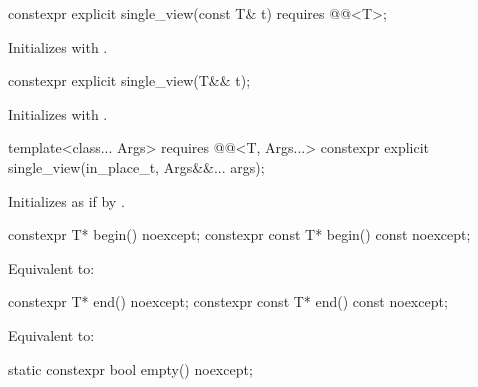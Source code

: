 %
\begin{itemdecl}
constexpr explicit single_view(const T& t) requires @@<T>;
\end{itemdecl}

\begin{itemdescr}
\pnum
\effects
Initializes  with .
\end{itemdescr}

%
\begin{itemdecl}
constexpr explicit single_view(T&& t);
\end{itemdecl}

\begin{itemdescr}
\pnum
\effects
Initializes  with .
\end{itemdescr}

%
\begin{itemdecl}
template<class... Args>
  requires @@<T, Args...>
constexpr explicit single_view(in_place_t, Args&&... args);
\end{itemdecl}

\begin{itemdescr}
\pnum
\effects
Initializes  as if by
.
\end{itemdescr}

%
\begin{itemdecl}
constexpr T* begin() noexcept;
constexpr const T* begin() const noexcept;
\end{itemdecl}

\begin{itemdescr}
\pnum
\effects
Equivalent to: 
\end{itemdescr}

%
\begin{itemdecl}
constexpr T* end() noexcept;
constexpr const T* end() const noexcept;
\end{itemdecl}

\begin{itemdescr}
\pnum
\effects
Equivalent to: 
\end{itemdescr}

%
\begin{itemdecl}
static constexpr bool empty() noexcept;
\end{itemdecl}

